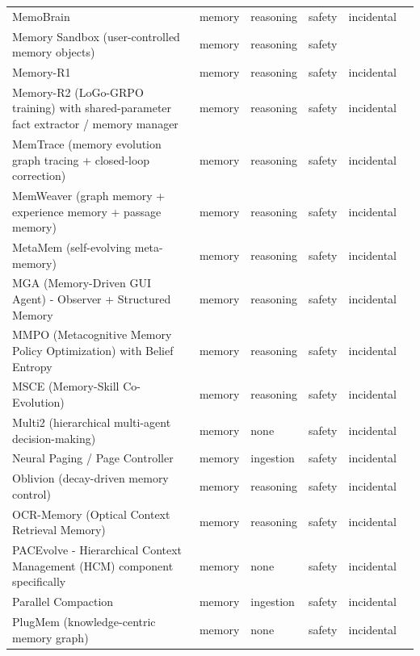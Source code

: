 \begin{longtable}{@{}p{}lllll@{}}
MemoBrain & memory & reasoning & safety & incidental & \cite{qian-2026-memobrain} \\
Memory Sandbox (user-controlled memory objects) & memory & reasoning & safety &  & \cite{huang-2023-memory} \\
Memory-R1 & memory & reasoning & safety & incidental & \cite{yan-2025-memoryr1} \\
Memory-R2 (LoGo-GRPO training) with shared-parameter fact extractor / memory manager & memory & reasoning & safety & incidental & \cite{yan-2026-memoryr2} \\
MemTrace (memory evolution graph tracing + closed-loop correction) & memory & reasoning & safety & incidental & \cite{deng-2026-memtrace} \\
MemWeaver (graph memory + experience memory + passage memory) & memory & reasoning & safety & incidental & \cite{ye-2026-memweaver} \\
MetaMem (self-evolving meta-memory) & memory & reasoning & safety & incidental & \cite{xin-2026-metamem} \\
MGA (Memory-Driven GUI Agent) - Observer + Structured Memory & memory & reasoning & safety & incidental & \cite{cheng-2025-mga} \\
MMPO (Metacognitive Memory Policy Optimization) with Belief Entropy & memory & reasoning & safety & incidental & \cite{liu-2026-metacognitive} \\
MSCE (Memory-Skill Co-Evolution) & memory & reasoning & safety & incidental & \cite{tang-2026-memory} \\
Multi2 (hierarchical multi-agent decision-making) & memory & none & safety & incidental & \cite{park-2026-multi} \\
Neural Paging / Page Controller & memory & ingestion & safety & incidental & \cite{chen-2026-neural} \\
Oblivion (decay-driven memory control) & memory & reasoning & safety & incidental & \cite{rana-2026-oblivion} \\
OCR-Memory (Optical Context Retrieval Memory) & memory & reasoning & safety & incidental & \cite{li-2026-ocrmemory} \\
PACEvolve - Hierarchical Context Management (HCM) component specifically & memory & none & safety & incidental & \cite{yan-2026-pacevolve} \\
Parallel Compaction & memory & ingestion & safety & incidental & \cite{cim-2026-parallel} \\
PlugMem (knowledge-centric memory graph) & memory & none & safety & incidental & \cite{yang-2026-plugmem} \\

\end{longtable}
